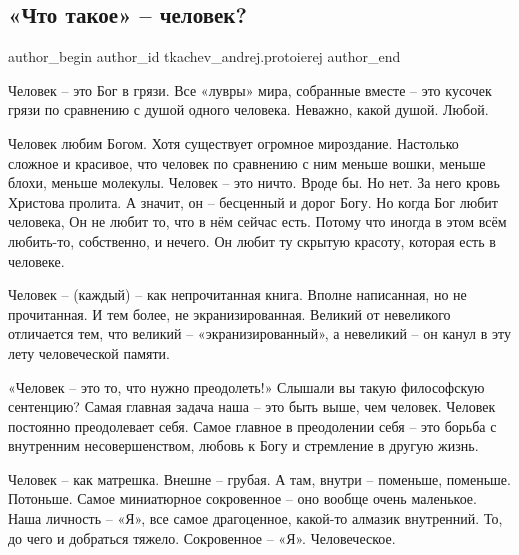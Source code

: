  
 
 
 
 

\subsection{«Что такое» – человек?}
\label{sec:20_11_2021.yz.tkachev_andrej.protoierej.1.chto_takoje_chelovek}

\ifcmt
 author_begin
   author_id tkachev_andrej.protoierej
 author_end
\fi

Человек – это Бог в грязи. Все «лувры» мира, собранные вместе – это кусочек
грязи по сравнению с душой одного человека. Неважно, какой душой. Любой.

Человек любим Богом. Хотя существует огромное мироздание. Настолько сложное и
красивое, что человек по сравнению с ним меньше вошки, меньше блохи, меньше
молекулы. Человек – это ничто. Вроде бы. Но нет. За него кровь Христова
пролита. А значит, он – бесценный и дорог Богу. Но когда Бог любит человека, Он
не любит то, что в нём сейчас есть. Потому что иногда в этом всём любить-то,
собственно, и нечего. Он любит ту скрытую красоту, которая есть в человеке.


Человек – (каждый) – как непрочитанная книга. Вполне написанная, но не
прочитанная. И тем более, не экранизированная. Великий от невеликого отличается
тем, что великий – «экранизированный», а невеликий – он канул в эту лету
человеческой памяти.

«Человек – это то, что нужно преодолеть!» Слышали вы такую философскую
сентенцию? Самая главная задача наша – это быть выше, чем человек. Человек
постоянно преодолевает себя. Самое главное в преодолении себя – это борьба с
внутренним несовершенством, любовь к Богу и стремление в другую жизнь.

Человек – как матрешка. Внешне – грубая. А там, внутри – поменьше, поменьше.
Потоньше. Самое миниатюрное сокровенное – оно вообще очень маленькое. Наша
личность – «Я», все самое драгоценное, какой-то алмазик внутренний. То, до чего
и добраться тяжело. Сокровенное – «Я». Человеческое.

